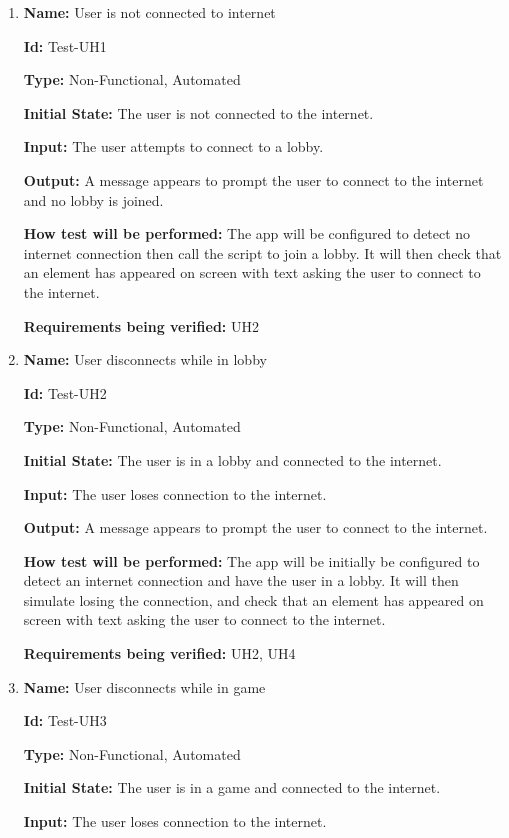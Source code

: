 \documentclass[12pt, titlepage]{article}
\begin{document}
\begin{enumerate} 

\item{\textbf{Name:} User is not connected to internet}

\textbf{Id:} Test-UH1

\textbf{Type:} Non-Functional, Automated
					
\textbf{Initial State:} The user is not connected to the internet. 
					
\textbf{Input:} The user attempts to connect to a lobby. 
					
\textbf{Output:} A message appears to prompt the user to connect to the internet and no lobby is joined.
					
\textbf{How test will be performed:} The app will be configured to detect no internet connection then call the script to join a lobby. It will then check that an element has appeared on screen with text asking the user to connect to the internet. 

\textbf{Requirements being verified:} UH2

\item{\textbf{Name:} User disconnects while in lobby}

\textbf{Id:} Test-UH2

\textbf{Type:} Non-Functional, Automated
					
\textbf{Initial State:} The user is in a lobby and connected to the internet.
					
\textbf{Input:} The user loses connection to the internet.
					
\textbf{Output:} A message appears to prompt the user to connect to the internet. 
					
\textbf{How test will be performed:} The app will be initially be configured to detect an internet connection and have the user in a lobby. It will then simulate losing the connection, and check that an element has appeared on screen with text asking the user to connect to the internet. 

\textbf{Requirements being verified:} UH2, UH4

\item{\textbf{Name:} User disconnects while in game}

\textbf{Id:} Test-UH3

\textbf{Type:} Non-Functional, Automated
					
\textbf{Initial State:} The user is in a game and connected to the internet.
					
\textbf{Input:} The user loses connection to the internet.
					

\end{enumerate}
\end{document}
